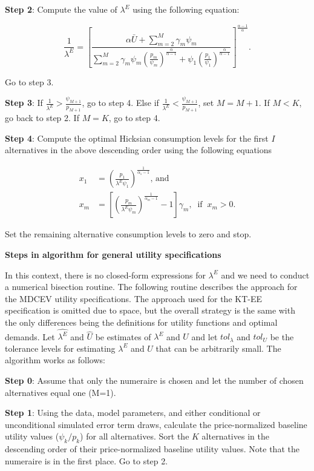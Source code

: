 \textbf{Step 2}: Compute the value of \(\lambda^E\) using the following
equation:

\begin{equation}
\frac{1}{\lambda^E} = \left[ \frac{\alpha \bar{U} + \sum_{m=2}^{M} \gamma_m \psi_m} {\sum_{m=2}^{M} \gamma_m \psi_m \left( \frac{p_m}{\psi_m} \right)^\frac{\alpha}{\alpha-1} + \psi_1 \left(\frac{p_1}{\psi_1} \right)^\frac{\alpha}{\alpha-1}} \right] ^\frac{\alpha-1}{\alpha}.
\end{equation}

Go to step 3.

\textbf{Step 3}: If
\(\frac{1}{\lambda^E} > \frac{\psi_{M+1}}{p_{M+1}}\), go to step 4. Else
if \(\frac{1}{\lambda^E} < \frac{\psi_{M+1}}{p_{M+1}}\), set
\(M = M + 1\). If \(M < K\), go back to step 2. If \(M = K\), go to step
4.

\textbf{Step 4}: Compute the optimal Hicksian consumption levels for the
first \(I\) alternatives in the above descending order using the
following equations

\begin{align}
\label{eq:optimal_x}
x_1 &=   \left( \frac{p_1}{\lambda^E \psi_1} \right)^\frac{1}{\alpha_1-1}\text{, and} \\
x_m &=   \left[ \left( \frac{p_m}{\lambda^E \psi_m} \right)^\frac{1}{\alpha_m-1}-1 \right]\gamma_m, \; \; \text{if} \; \; x_m > 0.
\end{align}

Set the remaining alternative consumption levels to zero and stop.

\textbf{Steps in algorithm for general utility specifications}

In this context, there is no closed-form expressions for \(\lambda^E\)
and we need to conduct a numerical bisection routine. The following
routine describes the approach for the MDCEV utility specifications. The
approach used for the KT-EE specification is omitted due to space, but
the overall strategy is the same with the only differences being the
definitions for utility functions and optimal demands. Let
\(\hat{\lambda^E}\) and \(\hat{U}\) be estimates of \(\lambda^E\) and
\(U\) and let \(tol_{\lambda}\) and \(tol_{U}\) be the tolerance levels
for estimating \(\lambda^E\) and \(U\) that can be arbitrarily small.
The algorithm works as follows:

\textbf{Step 0}: Assume that only the numeraire is chosen and let the
number of chosen alternatives equal one (M=1).

\textbf{Step 1}: Using the data, model parameters, and either
conditional or unconditional simulated error term draws, calculate the
price-normalized baseline utility values (\(\psi_k/p_k\)) for all
alternatives. Sort the \(K\) alternatives in the descending order of
their price-normalized baseline utility values. Note that the numeraire
is in the first place. Go to step 2.

